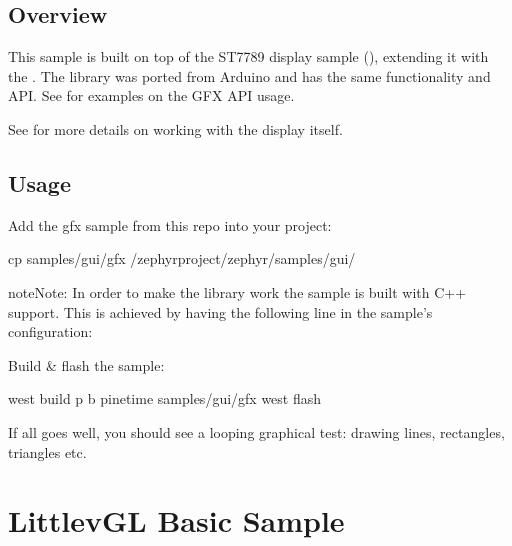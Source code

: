 \documentclass[letterpaper,10pt,english]{sphinxmanual}
\begin{document}
\section{Overview}
\label{\detokenize{gfx:overview}}
This sample is built on top of the ST7789 display sample ({\hyperref[\detokenize{display:display-sample}]{}}), extending it with the .
The library was ported from Arduino and has the same functionality and API.
See  for examples on the GFX API usage.

See {\hyperref[\detokenize{display:display-sample}]{}} for more details on working with the display itself.


\section{Usage}
\label{\detokenize{gfx:usage}}
Add the gfx sample from this repo into your project:

\begin{sphinxVerbatim}[commandchars=\\\{\}]
 cp samples/gui/gfx \PYGZti{}/zephyrproject/zephyr/samples/gui/
\end{sphinxVerbatim}

\begin{sphinxadmonition}{note}{Note:}
In order to make the library work the sample is built with C++ support. This is achieved by having the following line in the sample’s  configuration:

\end{sphinxadmonition}

Build \& flash the sample:

\begin{sphinxVerbatim}[commandchars=\\\{\}]
  west build \PYGZhy{}p \PYGZhy{}b pinetime samples/gui/gfx
  west flash
\end{sphinxVerbatim}

If all goes well, you should see a looping graphical test: drawing lines, rectangles, triangles etc.


\chapter{LittlevGL Basic Sample}
\label{\detokenize{lvgl:littlevgl-basic-sample}}\label{\detokenize{lvgl:lvgl-sample}}\label{\detokenize{lvgl::doc}}
\end{document}
